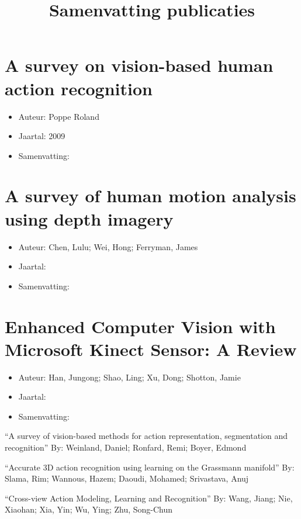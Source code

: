 \documentclass{article}
\title{Samenvatting publicaties}
\author{}
\date{}
\begin{document}
   \maketitle
   \section{A survey on vision-based human action recognition}
   \begin{itemize}
   	\item Auteur: Poppe Roland
   	\item Jaartal: 2009
   	\item Samenvatting:
   \end{itemize}

	\section {A survey of human motion analysis using depth imagery}
	\begin{itemize}
		\item Auteur: Chen, Lulu; Wei, Hong; Ferryman, James
		\item Jaartal:
		\item Samenvatting:
	\end{itemize}

	\section{Enhanced Computer Vision with Microsoft Kinect Sensor: A Review}
	\begin{itemize}
		\item Auteur: Han, Jungong; Shao, Ling; Xu, Dong; Shotton, Jamie
		\item Jaartal:
		\item Samenvatting:
	\end{itemize}
   
 

 


 

 
“A survey of vision-based methods for action representation, segmentation and recognition”
By: Weinland, Daniel; Ronfard, Remi; Boyer, Edmond
 
“Accurate 3D action recognition using learning on the Grassmann manifold”
By: Slama, Rim; Wannous, Hazem; Daoudi, Mohamed; Srivastava, Anuj
 
“Cross-view Action Modeling, Learning and Recognition”
By: Wang, Jiang; Nie, Xiaohan; Xia, Yin; Wu, Ying; Zhu, Song-Chun
 
\end{document}
